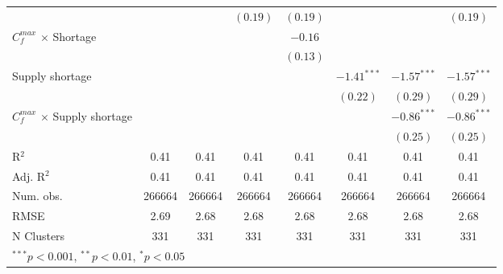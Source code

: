 \begin{tabular}{l c c c c c c c }
                                       &               &               & $(0.19)$      & $(0.19)$      &               &               & $(0.19)$      \\
$C^{max}_{f}$ $\times$ Shortage        &               &               &               & $-0.16$       &               &               &               \\
                                       &               &               &               & $(0.13)$      &               &               &               \\
Supply shortage                        &               &               &               &               & $-1.41^{***}$ & $-1.57^{***}$ & $-1.57^{***}$ \\
                                       &               &               &               &               & $(0.22)$      & $(0.29)$      & $(0.29)$      \\
$C^{max}_{f}$ $\times$ Supply shortage &               &               &               &               &               & $-0.86^{***}$ & $-0.86^{***}$ \\
                                       &               &               &               &               &               & $(0.25)$      & $(0.25)$      \\
\midrule
R$^2$                                  & 0.41          & 0.41          & 0.41          & 0.41          & 0.41          & 0.41          & 0.41          \\
Adj. R$^2$                             & 0.41          & 0.41          & 0.41          & 0.41          & 0.41          & 0.41          & 0.41          \\
Num. obs.                              & 266664        & 266664        & 266664        & 266664        & 266664        & 266664        & 266664        \\
RMSE                                   & 2.69          & 2.68          & 2.68          & 2.68          & 2.68          & 2.68          & 2.68          \\
N Clusters                             & 331           & 331           & 331           & 331           & 331           & 331           & 331           \\
\bottomrule
\multicolumn{8}{l}{\tiny{$^{***}p<0.001$, $^{**}p<0.01$, $^*p<0.05$}}
\end{tabular}

